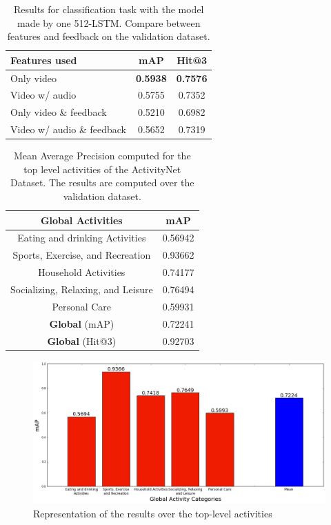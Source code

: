 \begin{table}[H]
\begin{center}
\begin{tabular}{|l|c|c|}
\hline
Features used & mAP & Hit@3 \\
\hline\hline
Only video & \bf0.5938 & \bf0.7576 \\
Video w/ audio & 0.5755 & 0.7352 \\
Only video \& feedback & 0.5210 & 0.6982 \\
Video w/ audio \& feedback & 0.5652 & 0.7319 \\
\hline
\end{tabular}
\end{center}
\caption{Results for classification task with the model made by one 512-LSTM. Compare between
         features and feedback on the validation dataset.}
\label{table:classification_by_features}
\end{table}



\begin{table}[H]
\begin{center}
\begin{tabular}{|c|c|}
\hline
\textbf{Global Activities} & \textbf{mAP} \\
\hline\hline
Eating and drinking Activities & 0.56942 \\
Sports, Exercise, and Recreation & 0.93662 \\
Household Activities & 0.74177 \\
Socializing, Relaxing, and Leisure & 0.76494 \\
Personal Care & 0.59931 \\
\hline\hline
\textbf{Global} (mAP) & 0.72241 \\
\textbf{Global} (Hit@3) & 0.92703 \\
\hline
\end{tabular}
\end{center}
\caption{Mean Average Precision computed for the top level activities of the ActivityNet Dataset. The results are computed over the validation dataset.}
\end{table}

\begin{figure}[H]
\begin{center}
\includegraphics[width=1\linewidth]{img/results/top_activities_map_2}
\end{center}
\caption{Representation of the results over the top-level activities}
\label{fig:top_level_classification_map}
\end{figure}




